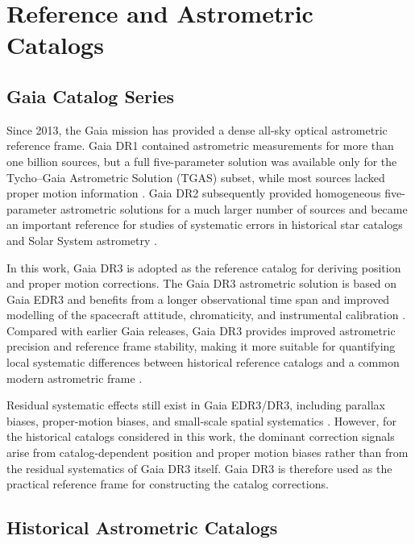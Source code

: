 \documentclass[linenumbers,amsmath,manuscript]{aastex702}
\begin{document}
\section{Reference and Astrometric Catalogs} \label{sec:catalogs}

\subsection{Gaia Catalog Series} \label{subsec:gaia}

Since 2013, the Gaia mission has provided a dense all-sky optical astrometric reference frame. Gaia DR1 contained astrometric measurements for more than one billion sources, but a full five-parameter solution was available only for the Tycho--Gaia Astrometric Solution (TGAS) subset, while most sources lacked proper motion information \citep{GaiaDR1,Lindegren2016}. Gaia DR2 subsequently provided homogeneous five-parameter astrometric solutions for a much larger number of sources and became an important reference for studies of systematic errors in historical star catalogs and Solar System astrometry \citep{GaiaDR2}.

In this work, Gaia DR3 is adopted as the reference catalog for deriving position and proper motion corrections. The Gaia DR3 astrometric solution is based on Gaia EDR3 and benefits from a longer observational time span and improved modelling of the spacecraft attitude, chromaticity, and instrumental calibration \citep{GaiaDR3,Lindegren2021EDR3}. Compared with earlier Gaia releases, Gaia DR3 provides improved astrometric precision and reference frame stability, making it more suitable for quantifying local systematic differences between historical reference catalogs and a common modern astrometric frame \citep{Fabricius2021}.

Residual systematic effects still exist in Gaia EDR3/DR3, including parallax biases, proper-motion biases, and small-scale spatial systematics \citep{Lindegren2021Systematics,CantatGaudin2021}. However, for the historical catalogs considered in this work, the dominant correction signals arise from catalog-dependent position and proper motion biases rather than from the residual systematics of Gaia DR3 itself. Gaia DR3 is therefore used as the practical reference frame for constructing the catalog corrections.

\subsection{Historical Astrometric Catalogs} \label{subsec:historical}
\end{document}

